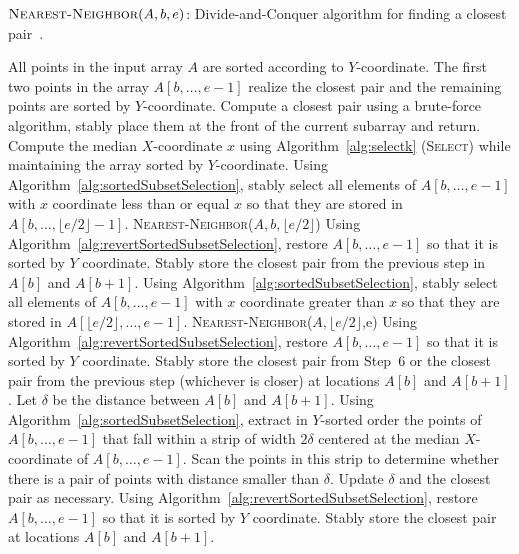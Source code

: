 \begin{algorithm} \label{alg:nn}
  \caption{$\textsc{Nearest-Neighbor}(A,b,e)$: Divide-and-Conquer algorithm for finding a closest
    pair~\cite{bentley:divide-and-conquer}.} 
  \begin{algorithmic}[1]
    \REQUIRE All points in the input array $A$ are sorted according to
    $Y$-coordinate.
    \ENSURE The first two points in the array $A[b,\ldots,e-1]$ realize the closest pair and the remaining points are sorted by $Y$-coordinate.
      \STATE Compute a closest pair using a brute-force
algorithm, stably place them at the front of the current subarray and return.
    \ELSE
      \STATE Compute the median $X$-coordinate $x$ using
Algorithm~\ref{alg:selectk} (\textsc{Select}) while maintaining the array
sorted by $Y$-coordinate.
      \STATE Using Algorithm~\ref{alg:sortedSubsetSelection}, stably select all
elements of $A[b,\ldots,e-1]$ with $x$ coordinate less than or equal $x$ so
that they are stored in $A[b,\ldots,\lfloor e/2\rfloor-1]$. 
      \STATE \textsc{Nearest-Neighbor}($A,b,\lfloor e/2 \rfloor$)
      \STATE Using Algorithm~\ref{alg:revertSortedSubsetSelection}, restore
$A[b,\ldots,e-1]$ so that it is sorted by $Y$ coordinate.  Stably store the
closest pair from the previous step in $A[b]$ and $A[b+1]$.
       \STATE Using Algorithm~\ref{alg:sortedSubsetSelection}, stably select all elements of $A[b,\ldots,e-1]$ with $x$
coordinate greater than $x$ so that they are stored in
$A[\lfloor e/2\rfloor,\ldots,e-1]$. 
      \STATE \textsc{Nearest-Neighbor}($A,\lfloor e/2 \rfloor$,e)
       \STATE Using Algorithm~\ref{alg:revertSortedSubsetSelection}, restore
$A[b,\ldots,e-1]$ so that it is sorted by $Y$ coordinate.  Stably store the
closest pair from Step~6 or the closest pair from the previous step (whichever
is closer) at
locations $A[b]$ and $A[b+1]$.
      \STATE Let $\delta$ be the distance between $A[b]$ and $A[b+1]$.
      \STATE Using Algorithm~\ref{alg:sortedSubsetSelection}, extract in $Y$-sorted order the points of $A[b,\ldots,e-1]$ that fall within a
                strip of width $2\delta$ centered at the median $X$-coordinate of $A[b,\ldots,e-1]$.
         \STATE Scan the points in this strip to determine whether there is a pair of
                points with distance smaller than $\delta$. Update $\delta$ and
                the closest pair as necessary. 
        \STATE Using Algorithm~\ref{alg:revertSortedSubsetSelection}, restore
$A[b,\ldots,e-1]$ so that it is sorted by $Y$ coordinate.  Stably store the closest pair 
at
locations $A[b]$ and $A[b+1]$.
    \ENDIF
  \end{algorithmic}
\end{algorithm}

